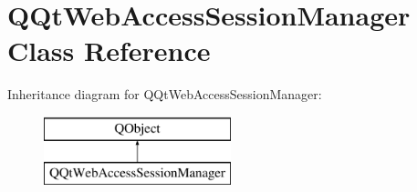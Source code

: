 \hypertarget{class_q_qt_web_access_session_manager}{}\section{Q\+Qt\+Web\+Access\+Session\+Manager Class Reference}
\label{class_q_qt_web_access_session_manager}
Inheritance diagram for Q\+Qt\+Web\+Access\+Session\+Manager\+:\begin{figure}[H]
\begin{center}
\leavevmode
\includegraphics[height=2.000000cm]{class_q_qt_web_access_session_manager}
\end{center}
\end{figure}
